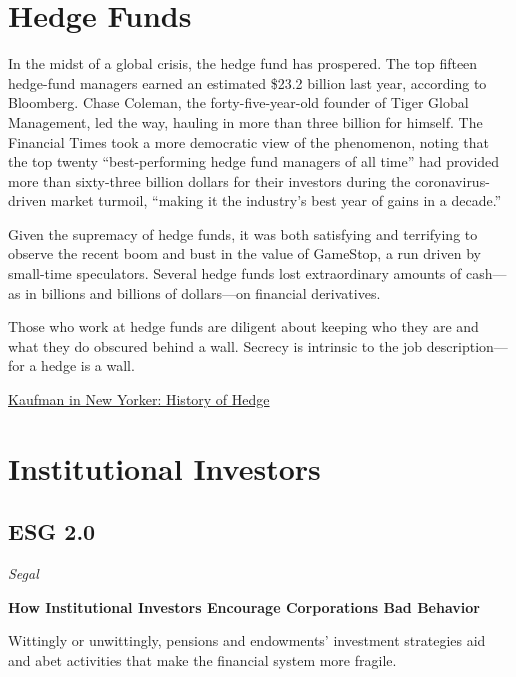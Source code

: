 \documentclass[
]{book}
\begin{document}
\hypertarget{hedge-funds-1}{%
\chapter{Hedge Funds}\label{hedge-funds-1}}

In the midst of a global crisis, the hedge fund has prospered. The top fifteen hedge-fund managers earned an estimated \$23.2 billion last year, according to Bloomberg. Chase Coleman, the forty-five-year-old founder of Tiger Global Management, led the way, hauling in more than three billion for himself. The Financial Times took a more democratic view of the phenomenon, noting that the top twenty ``best-performing hedge fund managers of all time'' had provided more than sixty-three billion dollars for their investors during the coronavirus-driven market turmoil, ``making it the industry's best year of gains in a decade.''

Given the supremacy of hedge funds, it was both satisfying and terrifying to observe the recent boom and bust in the value of GameStop, a run driven by small-time speculators. Several hedge funds lost extraordinary amounts of cash---as in billions and billions of dollars---on financial derivatives.

Those who work at hedge funds are diligent about keeping who they are and what they do obscured behind a wall. Secrecy is intrinsic to the job description---for a hedge is a wall.

\href{https://www.newyorker.com/culture/culture-desk/a-brief-history-of-the-hedge-fund}{Kaufman in New Yorker: History of Hedge}

\hypertarget{institutional-investors-1}{%
\chapter{Institutional Investors}\label{institutional-investors-1}}

\hypertarget{esg-2.0-1}{%
\section{ESG 2.0}\label{esg-2.0-1}}

\emph{Segal}

\textbf{How Institutional Investors Encourage Corporations Bad Behavior}

Wittingly or unwittingly, pensions and endowments' investment strategies aid and abet activities that make the financial system more fragile.
\end{document}

